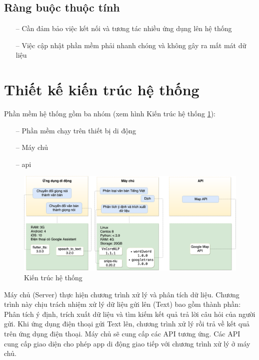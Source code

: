 \subsection{Ràng buộc thuộc tính}
\begin{itemize}
    \item[--] Cần đảm bảo việc kết nối và tương tác nhiều ứng dụng lên hệ thống
    \item[--] Việc cập nhật phần mềm phải nhanh chóng và không gây ra mất mát dữ liệu
\end{itemize}

\section{Thiết kế kiến trúc hệ thống}
Phần mềm hệ thống gồm ba nhóm (xem hình Kiến trúc hệ thống \ref{fig:kien-truc-he-thong}):
\begin{itemize}
    \item[--] Phần mềm chạy trên thiết bị di động
    \item[--] Máy chủ
    \item[--] \ac{api}
\end{itemize}
\begin{figure}[htp]
    \centering
    \includegraphics[width=15cm]{images/Structure-System.png}
    \caption{Kiến trúc hệ thống}
    \label{fig:kien-truc-he-thong}
\end{figure}

Máy chủ (Server) thực hiện chương trình xử lý và phân tích dữ liệu. Chương trình này chịu trách nhiệm xử lý dữ liệu gửi lên (Text) bao gồm thành phần: Phân tích ý định, trích xuất dữ liệu và tìm kiếm kết quả trả lời câu hỏi của người gửi. Khi ứng dụng điện thoại gửi Text lên, chương trình xử lý rồi trả về kết quả trên ứng dụng điện thoại. Máy chủ sẽ cung cấp các API tương ứng. Các API cung cấp giao diện cho phép app di động giao tiếp với chương trình xử lý ở máy chủ.

